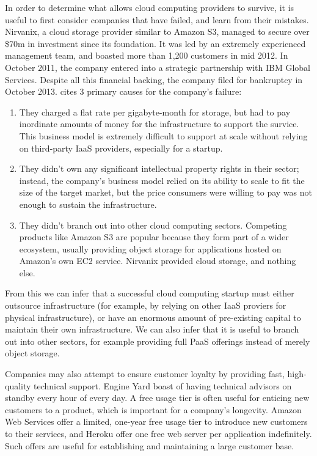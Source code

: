 \documentclass[a4paper]{proc}
\begin{document}

  In order to determine what allows cloud computing providers to survive, it is useful to first consider companies that have failed, and learn from their mistakes. Nirvanix, a cloud storage provider similar to Amazon S3, managed to secure over \$70m in investment since its foundation. It was led by an extremely experienced management team, and boasted more than 1,200 customers in mid 2012. In October 2011, the company entered into a strategic partnership with IBM Global Services. Despite all this financial backing, the company filed for bankruptcy in October 2013. \textcite{Robinson2013} cites 3 primary causes for the company's failure:

  \begin{enumerate}
    \item They charged a flat rate per gigabyte-month for storage, but had to pay inordinate amounts of money for the infrastructure to support the survice. This business model is extremely difficult to support at scale without relying on third-party IaaS providers, especially for a startup.
    \item They didn't own any significant intellectual property rights in their sector; instead, the company's business model relied on its ability to scale to fit the size of the target market, but the price consumers were willing to pay was not enough to sustain the infrastructure.
    \item They didn't branch out into other cloud computing sectors. Competing products like Amazon S3 are popular because they form part of a wider ecosystem, usually providing object storage for applications hosted on Amazon's own EC2 service. Nirvanix provided cloud storage, and nothing else.
  \end{enumerate}

  From this we can infer that a successful cloud computing startup must either outsource infrastructure (for example, by relying on other IaaS proviers for physical infrastructure), or have an enormous amount of pre-existing capital to maintain their own infrastructure. We can also infer that it is useful to branch out into other sectors, for example providing full PaaS offerings instead of merely object storage.

  Companies may also attempt to ensure customer loyalty by providing fast, high-quality technical support. Engine Yard boast of having technical advisors on standby every hour of every day. A free usage tier is often useful for enticing new customers to a product, which is important for a company's longevity. Amazon Web Services offer a limited, one-year free usage tier to introduce new customers to their services, and Heroku offer one free web server per application indefinitely. Such offers are useful for establishing and maintaining a large customer base.
\end{document}
